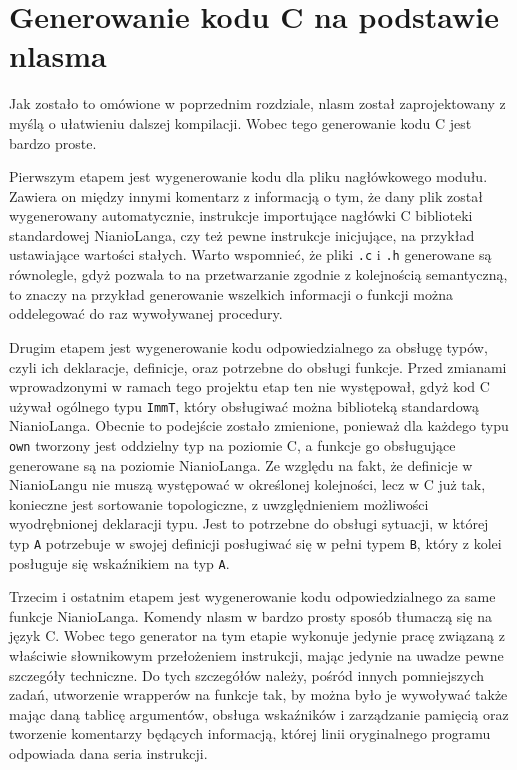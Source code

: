 \documentclass[licencjacka]{pracamgr}
\begin{document}
\section{Generowanie kodu C na podstawie nlasma}
Jak zostało to omówione w poprzednim rozdziale, nlasm został zaprojektowany z myślą o ułatwieniu dalszej kompilacji. Wobec tego generowanie
kodu C jest bardzo proste.


Pierwszym etapem jest wygenerowanie kodu dla pliku nagłówkowego modułu. Zawiera on między innymi komentarz z informacją o tym, że dany plik został
wygenerowany automatycznie, instrukcje importujące nagłówki C biblioteki standardowej NianioLanga, czy też pewne instrukcje inicjujące, na przykład
ustawiające wartości stałych. Warto wspomnieć, że pliki \texttt{.c} i \texttt{.h} generowane są równolegle, gdyż pozwala to na przetwarzanie zgodnie z
kolejnością semantyczną, to znaczy na przykład generowanie wszelkich informacji o funkcji można oddelegować do raz wywoływanej procedury.


Drugim etapem jest wygenerowanie kodu odpowiedzialnego za obsługę typów, czyli ich deklaracje, definicje, oraz potrzebne do obsługi funkcje. Przed
zmianami wprowadzonymi w ramach tego projektu etap ten nie występował, gdyż kod C używał ogólnego typu \texttt{ImmT}, który obsługiwać można
biblioteką standardową NianioLanga. Obecnie to podejście zostało zmienione, ponieważ dla każdego typu \texttt{own} tworzony jest oddzielny typ na poziomie C, a funkcje go
obsługujące generowane są na poziomie NianioLanga. Ze względu na fakt, że definicje w NianioLangu nie muszą występować
w określonej kolejności, lecz w C już tak, konieczne jest sortowanie topologiczne, z uwzględnieniem możliwości wyodrębnionej deklaracji typu. Jest to
potrzebne do obsługi sytuacji, w której typ \texttt{A} potrzebuje w swojej definicji posługiwać się w pełni typem \texttt{B}, który z kolei posługuje
się wskaźnikiem na typ \texttt{A}.


Trzecim i ostatnim etapem jest wygenerowanie kodu odpowiedzialnego za same funkcje NianioLanga. Komendy nlasm w bardzo prosty sposób tłumaczą się na
język C.
Wobec tego generator na tym etapie wykonuje jedynie pracę związaną z właściwie słownikowym przełożeniem instrukcji,
mając jedynie na uwadze pewne szczegóły techniczne. Do tych szczegółów należy, pośród innych pomniejszych zadań, utworzenie wrapperów na funkcje tak,
by można było je wywoływać także mając daną tablicę argumentów, obsługa wskaźników i zarządzanie pamięcią oraz tworzenie komentarzy będących
informacją, której linii oryginalnego programu odpowiada dana seria instrukcji.
\end{document}
